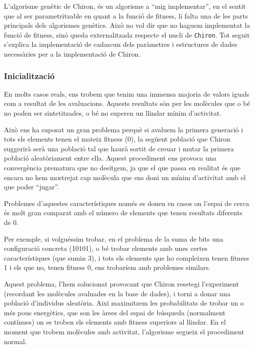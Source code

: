 L'algorisme genètic de Chiron, és un algorisme a ``mig implementar'', en el
sentit que  al ser parametritzable en quant a la funció de fitness, li falta una
de les parts principals dels algorismes genètics.  Això no vol dir que no haguem
implementat la funció de fitness, sinó queda externalitzada respecte el nucli de
\texttt{Chiron}.  Tot seguit s'explica la implementació de cadascun dels
paràmetres i estructures de dades necessàries per a la implementació de Chiron.

\subsubsection{Inicialització} %
\label{ssub:Inicialitzacio}

En  molts casos reals, ens trobem que tenim una immensa majoria de valors iguals
com a resultat de les avaluacions.  Aquests resultats són per les molècules que
o bé no poden ser sintetitzades, o bé no superen un llindar mínim d'activitat.

Això ens ha suposat un gran problema perquè si avaluem la primera generació i
tots els elements tenen el mateix fitness (0), la següent població que Chiron
suggerirà serà una població tal que haurà sortit de creuar i mutar la primera
població aleatòriament entre ella.  Aquest procediment ens provoca una
convergència prematura que no desitgem, ja que el que passa en realitat és que
encara no hem mostrejat cap molècula que ens doni un mínim d'activitat amb el
que poder ``jugar''.

Problemes d'aquestes característiques només es donen en casos on l'espai de
cerca és molt gran comparat amb el número de elements que tenen resultats
diferents de 0.

Per exemple, si volguéssim trobar, en el problema de la suma de bits una
configuració concreta (10101), o bé trobar elements amb unes certes
característiques (que sumin 3), i tots els elements que ho compleixen tenen
fitness 1 i els que no, tenen fitness 0, ens trobaríem amb problemes similars.

Aquest problema, l'hem solucionat provocant que Chiron resetegi l'experiment
(recordant les molècules avaluades en la base de dades), i torni a donar una
població d'individus aleatòria.  Així maximitzem les probabilitats de trobar un
o més pous energètics, que son les àrees del espai de búsqueda (normalment
contínues) on es troben els elements amb fitness superiors al llindar.  En el
moment que trobem molècules amb activitat, l'algorisme segueix el procediment
normal.

